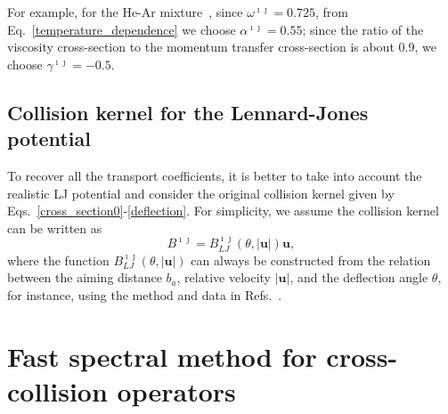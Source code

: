 For example, for the He-Ar mixture~\cite{Bird1994}, since $\omega^{\imath\jmath}=0.725$, from Eq.~\eqref{temperature_dependence} we choose $\alpha^{\imath\jmath}=0.55$; since the ratio of the viscosity cross-section to the momentum transfer cross-section is about $0.9$, we choose $\gamma^{\imath\jmath}=-0.5$.





\subsection{Collision kernel for the Lennard-Jones potential}

To recover all the transport coefficients, it is better to take into account the realistic LJ potential and consider the original collision kernel given by Eqs.~\eqref{cross_section0}-\eqref{deflection}. For simplicity, we assume the collision kernel can be written as
\begin{equation}\label{kernel_LJ}
B^{\imath\jmath}=B_{LJ}^{\imath\jmath}(\theta,|\textbf{u}|)\textbf{u},
\end{equation}
where the function $B_{LJ}^{\imath\jmath}(\theta,|\textbf{u}|)$ can always be constructed from the relation between the aiming distance $b_a$, relative velocity $|\textbf{u}|$, and the deflection angle $\theta$, for instance, using the method and data in Refs.~\cite{Sharipov2009a,Venkattraman2012}.



\section{Fast spectral method for cross-collision operators}


